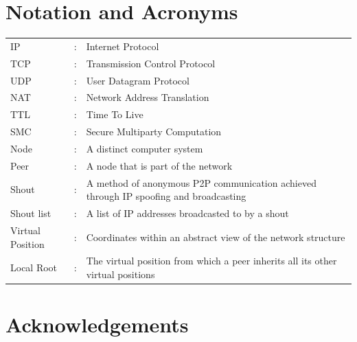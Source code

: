 \documentclass[ %
                    author={Luke Murray},
                supervisor={Dr. Simon Hollis},
                     title={Shadow Peer-to-Peer Networks},
                  subtitle={},
                    degree={MEng},
                      year={2013} ]{thesis}
\begin{document}
\chapter*{Notation and Acronyms}

\begin{tabular}{lcl}
IP                &:     & Internet Protocol\\
TCP               &:     & Transmission Control Protocol\\
UDP               &:     & User Datagram Protocol\\
NAT               &:     & Network Address Translation\\
TTL               &:     & Time To Live\\
SMC               &:     & Secure Multiparty Computation\\

Node              &:     & A distinct computer system\\
Peer              &:     & A node that is part of the network\\
Shout             &:     & A method of anonymous P2P communication achieved through IP spoofing and broadcasting\\
Shout list        &:     & A list of IP addresses broadcasted to by a shout\\
Virtual Position  &:     & Coordinates within an abstract view of the network structure\\
Local Root        &:     & The virtual position from which a peer inherits all its other virtual positions\\

\end{tabular}


\chapter*{Acknowledgements}

\end{document}
